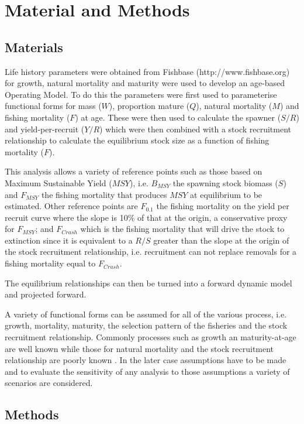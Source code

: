 \documentclass[preprint,review,12pt]{elsarticle}
\begin{document}
\section{Material and Methods}
\subsection{Materials}


Life history parameters were obtained from Fishbase (http://www.fishbase.org) for growth, natural mortality and maturity were used to develop an age-based Operating Model. To do this the parameters were first used to parameterise functional forms for mass ($W$), proportion mature ($Q$), natural mortality ($M$) and fishing mortality ($F$) at age. These were then used to calculate the  spawner ($S/R$) and yield-per-recruit ($Y/R$) which were then combined with a stock recruitment relationship \cite{sissenwine1987alternative} to calculate the equilibrium stock size as a function of fishing mortality ($F$). 

This analysis allows a variety of reference points such as those based on Maximum Sustainable Yield ($MSY$), i.e. $B_{MSY}$ the spawning stock biomass ($S$) and $F_{MSY}$ the fishing mortality that produces $MSY$ at equilibrium to be estimated. Other reference points are $F_{0.1}$ the fishing mortality on the yield per recruit curve where the slope is 10\% of that at the origin, a conservative proxy for $F_{MSY}$; and
$F_{Crash}$ which is the fishing mortality that will drive the stock to extinction since it is equivalent to a $R/S$ greater than the slope at the origin of the stock recruitment relationship, i.e. recruitment can not replace removals for a fishing mortality equal to $F_{Crash}$.  

The equilibrium relationships can then be turned into a forward dynamic model and projected forward.

A variety of functional forms can be assumed for all of the various process, i.e. growth, mortality, maturity, the selection pattern of the fisheries and the stock recruitment relationship. Commonly processes such as growth an maturity-at-age are well known while those for natural mortality and the stock recruitment relationship are poorly known \cite{michielsens2004bayesian}. In the later case assumptions have to be made and to evaluate the sensitivity of any analysis to those assumptions a variety of scenarios are considered. 

\subsection{Methods}
\end{document}
